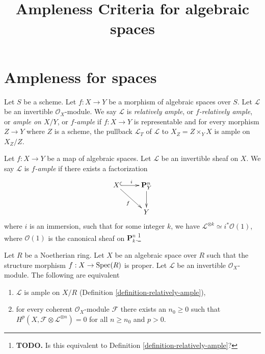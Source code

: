 


\newcommand{\todo}[1]{\footnote{\textbf{TODO.} #1}}

\title{Ampleness Criteria for algebraic spaces}
\maketitle

\section{Ampleness for spaces}
\begin{definition}
Let $S$ be a scheme.
Let $f : X \to Y$ be a morphism of algebraic spaces over $S$.
Let $\mathcal{L}$ be an invertible $\mathcal{O}_X$-module.
We say $\mathcal{L}$ is {\it relatively ample}, or {\it $f$-relatively ample},
or {\it ample on $X/Y$}, or {\it $f$-ample} if $f : X \to Y$
is representable and for every morphism $Z \to Y$
where $Z$ is a scheme, the pullback $\mathcal{L}_T$ of $\mathcal{L}$
to $X_Z = Z \times_Y X$ is ample on $X_Z/Z$.
\end{definition}

\begin{definition}[{\cite[II, Def.\ 7.9]{Kn}}]\label{definition-knutson-ample}
  Let $f : X \to Y$ be a map of algebraic spaces. Let $\mathcal{L}$ be an
  invertible sheaf on $X$. We say $\mathcal{L}$ is {\it $f$-ample} if there
  exists a factorization
  $$
  \xymatrix{
    X \ar@{^{(}->}[r]^i\ar[dr]_f & \mathbf{P}^n_Y \ar[d]\\
    & Y
  }
  $$
  where $i$ is an immersion, such that for some integer $k$, we have
  $\mathcal{L}^{\otimes k} \simeq i^*\mathcal{O}(1)$, where $\mathcal{O}(1)$ is
  the canonical sheaf on $\mathbf{P}^n_k$.\todo{Is this equivalent to Definition
  \ref{definition-relatively-ample}?}
\end{definition}

\begin{lemma}
Let $R$ be a Noetherian ring. Let $X$ be an algebraic space over $R$
such that the structure morphism $f : X \to \mathop{\rm Spec}(R)$ is proper.
Let $\mathcal{L}$ be an invertible $\mathcal{O}_X$-module.
The following are equivalent
\begin{enumerate}
\item $\mathcal{L}$ is ample on $X/R$
(Definition \ref{definition-relatively-ample}),
\item for every coherent $\mathcal{O}_X$-module $\mathcal{F}$
there exists an $n_0 \geq 0$ such that
$H^p(X, \mathcal{F} \otimes \mathcal{L}^{\otimes n}) = 0$
for all $n \geq n_0$ and $p > 0$.
\end{enumerate}
\end{lemma}

